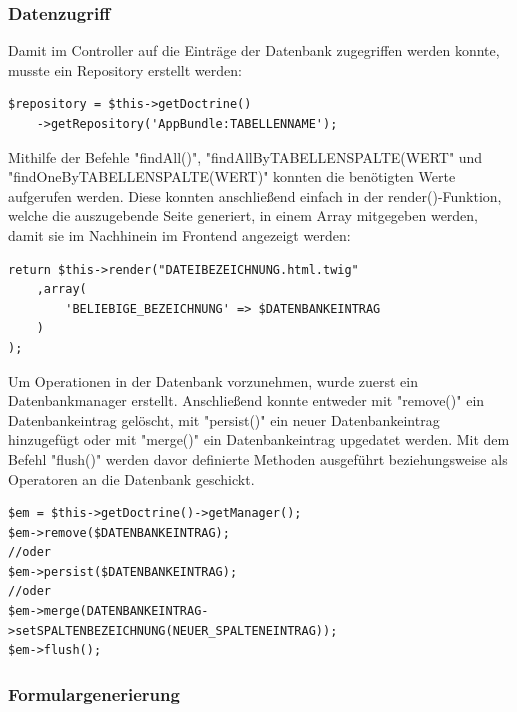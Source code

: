     \subsubsection{Datenzugriff}

Damit im Controller auf die Einträge der Datenbank zugegriffen werden konnte, musste ein Repository erstellt werden:
	\lstset{language=php}
  	\begin{lstlisting}
$repository = $this->getDoctrine()
    ->getRepository('AppBundle:TABELLENNAME');
  	\end{lstlisting}
Mithilfe der Befehle "findAll()", "findAllByTABELLENSPALTE(WERT" und "findOneByTABELLENSPALTE(WERT)" konnten die benötigten Werte aufgerufen werden.
Diese konnten anschließend einfach in der render()-Funktion, welche die auszugebende Seite generiert, in einem Array mitgegeben werden, damit sie im Nachhinein im Frontend angezeigt werden:
	\lstset{language=php}
  	\begin{lstlisting}
return $this->render("DATEIBEZEICHNUNG.html.twig"
    ,array(
    	'BELIEBIGE_BEZEICHNUNG' => $DATENBANKEINTRAG
    )
);
  	\end{lstlisting}
Um Operationen in der Datenbank vorzunehmen, wurde zuerst ein Datenbankmanager erstellt. Anschließend konnte entweder mit "remove()" ein Datenbankeintrag gelöscht, mit "persist()" ein neuer Datenbankeintrag hinzugefügt oder mit "merge()" ein Datenbankeintrag upgedatet werden. Mit dem Befehl "flush()" werden davor definierte Methoden ausgeführt beziehungsweise als Operatoren an die Datenbank geschickt.

	\lstset{language=php}
  	\begin{lstlisting}
$em = $this->getDoctrine()->getManager();
$em->remove($DATENBANKEINTRAG);
//oder
$em->persist($DATENBANKEINTRAG);
//oder
$em->merge(DATENBANKEINTRAG->setSPALTENBEZEICHNUNG(NEUER_SPALTENEINTRAG));
$em->flush();
  	\end{lstlisting}


    \subsubsection{Formulargenerierung}

